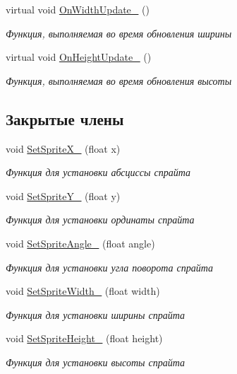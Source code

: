 \begin{DoxyCompactItemize}
virtual void \hyperlink{classrtm_1_1_world_object_acb07848ff4e36ac3b77a6c2aea2f6547}{On\+Width\+Update\+\_\+} ()
\begin{DoxyCompactList}\small\item\em Функция, выполняемая во время обновления ширины \end{DoxyCompactList}\item 
\mbox{\label{classrtm_1_1_world_object_a3261c4ad76d199370db74a4fd09ddf29}} 
virtual void \hyperlink{classrtm_1_1_world_object_a3261c4ad76d199370db74a4fd09ddf29}{On\+Height\+Update\+\_\+} ()
\begin{DoxyCompactList}\small\item\em Функция, выполняемая во время обновления высоты \end{DoxyCompactList}\end{DoxyCompactItemize}
\subsection*{Закрытые члены}
\begin{DoxyCompactItemize}
\item 
void \hyperlink{classrtm_1_1_world_object_a57de67f0e2788f0b3226beb2b84a5551}{Set\+Sprite\+X\+\_\+} (float x)
\begin{DoxyCompactList}\small\item\em Функция для установки абсциссы спрайта \end{DoxyCompactList}\item 
void \hyperlink{classrtm_1_1_world_object_a885eff01e5b07ef96194a868ff1fe338}{Set\+Sprite\+Y\+\_\+} (float y)
\begin{DoxyCompactList}\small\item\em Функция для установки ординаты спрайта \end{DoxyCompactList}\item 
void \hyperlink{classrtm_1_1_world_object_a5daee1cc41f0657f33d6790c22614f5e}{Set\+Sprite\+Angle\+\_\+} (float angle)
\begin{DoxyCompactList}\small\item\em Функция для установки угла поворота спрайта \end{DoxyCompactList}\item 
void \hyperlink{classrtm_1_1_world_object_a2a88c51a636b8b8c94320c0f6d66feb7}{Set\+Sprite\+Width\+\_\+} (float width)
\begin{DoxyCompactList}\small\item\em Функция для установки ширины спрайта \end{DoxyCompactList}\item 
void \hyperlink{classrtm_1_1_world_object_a553abd97f4f63659282f1e903dfc074b}{Set\+Sprite\+Height\+\_\+} (float height)
\begin{DoxyCompactList}\small\item\em Функция для установки высоты спрайта \end{DoxyCompactList}\end{DoxyCompactItemize}
